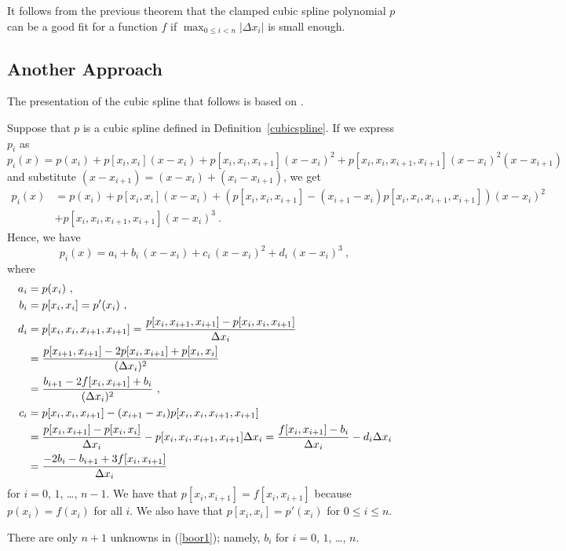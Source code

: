 It follows from the previous theorem that the clamped cubic spline
polynomial $p$ can be a good fit for a function $f$ if
$\displaystyle \max_{0\leq i < n} |\Delta x_i|$ is small enough.

\subsection{Another Approach}

The presentation of the cubic spline that follows is based on
\cite{CdB}.

Suppose that $p$ is a cubic spline defined in
Definition~\ref{cubicspline}.  If we express $p_i$ as
\[
p_i(x) = p(x_i) + p[x_i,x_i] (x-x_i) + p[x_i,x_i,x_{i+1}](x-x_i)^2
+ p[x_i,x_i,x_{i+1},x_{i+1}](x-x_i)^2(x-x_{i+1})
\]
and substitute $(x-x_{i+1}) = (x-x_i) + (x_i-x_{i+1})$, we get
\begin{align*}
p_i(x) &= p(x_i) + p[x_i,x_i] (x-x_i) +
\left(p[x_i,x_i,x_{i+1}] - (x_{i+1}-x_i)p[x_i,x_i,x_{i+1},x_{i+1}]\right)
(x-x_i)^2 \\
&+ p[x_i,x_i,x_{i+1},x_{i+1}](x-x_i)^3 \ .
\end{align*}
Hence, we have
\[
p_i(x) = a_i + b_i\,(x-x_i) + c_i\,(x-x_i)^2 + d_i\,(x-x_i)^3 \  ,
\]
where
\begin{equation}\label{boor1}
\begin{split}
a_i &= p(x_i)  \ , \\
b_i &= p[x_i,x_i] = p'(x_i) \ , \\
d_i &= p[x_i,x_i,x_{i+1},x_{i+1}]
= \frac{p[x_i,x_{i+1},x_{i+1}] - p[x_i,x_i,x_{i+1}]}{\Delta{x_i}} \\
&= \frac{p[x_{i+1},x_{i+1}] - 2p[x_i,x_{i+1}] + p[x_i,x_i]}{(\Delta{x_i})^2} \\
& = \frac{b_{i+1} - 2 f[x_i,x_{i+1}] + b_i}{(\Delta{x_i})^2} \ ,\\
c_i &= p[x_i,x_i,x_{i+1}] - (x_{i+1}-x_i)p[x_i,x_i,x_{i+1},x_{i+1}] \\
&= \frac{p[x_i,x_{i+1}]-p[x_i,x_i]}{\Delta{x_i}}
- p[x_i,x_i,x_{i+1},x_{i+1}] \Delta{x_i}
= \frac{f[x_i,x_{i+1}]- b_i}{\Delta{x_i}} -  d_i \Delta{x_i} \\
&= \frac{-2b_i - b_{i+1} + 3f[x_i,x_{i+1}]}{\Delta{x_i}}
\end{split}
\end{equation}
for $i=0$, $1$, \ldots, $n-1$.  We have that
$p[x_i,x_{i+1}] = f[x_i,x_{i+1}]$ because $p(x_i) = f(x_i)$ for all
$i$.  We also have that $p[x_i,x_i] = p'(x_i)$ for $0\leq i \leq n$.

There are only $n+1$ unknowns in (\ref{boor1}); namely,
$b_i$ for $i=0$, $1$, \ldots, $n$.

